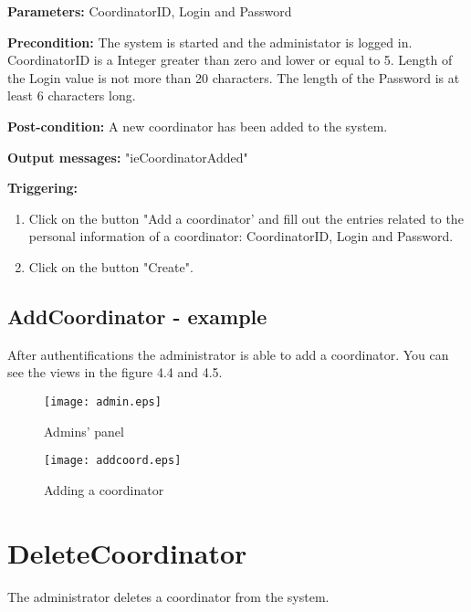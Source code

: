\begin{description}
	\item \textbf{Parameters:} CoordinatorID, Login and Password
	\item \textbf{Precondition:} The system is started and the administator is
	logged in. CoordinatorID is a Integer greater than zero and lower or equal to
	5. Length of the Login value is not more than 20 characters. The length of the
	Password is at least 6 characters long.
	\item \textbf{Post-condition:} A new coordinator has been added to the system.
	\item \textbf{Output messages:} "ieCoordinatorAdded"
	
	\item \textbf{Triggering:}
	
	\begin{enumerate}
		\item Click on the button "Add a coordinator' and fill out the entries related
		to the personal information of a coordinator: CoordinatorID, Login and Password.
		\item Click on the button "Create".
	\end{enumerate}
\end{description}

\subsection{AddCoordinator - example}

After authentifications the administrator is able to add a coordinator. You can
see the views in the figure 4.4 and 4.5.

\begin{figure}
    \texttt{[image: admin.eps]}
	\caption{Admins' panel}
\end{figure}

\begin{figure}
    \texttt{[image: addcoord.eps]}
	\caption{Adding a coordinator}
\end{figure}



\section{DeleteCoordinator}
\label{operation:DeleteCoordinator}

The administrator deletes a coordinator from the system.


